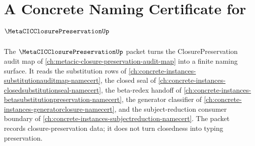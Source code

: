 \chapter{A Concrete Naming Certificate for $\MetaCICClosurePreservationUp$}
\label{ch:concrete-instances-metacicclosurepreservation-namecert}

The $\MetaCICClosurePreservationUp$ packet turns the ClosurePreservation audit map of \autoref{ch:metacic-closure-preservation-audit-map} into a finite naming surface. It reads the substitution rows of \autoref{ch:concrete-instances-substitutionauditmap-namecert}, the closed seal of \autoref{ch:concrete-instances-closedsubstitutionseal-namecert}, the beta-redex handoff of \autoref{ch:concrete-instances-betasubstitutionpreservation-namecert}, the generator classifier of \autoref{ch:concrete-instances-generatorclosure-namecert}, and the subject-reduction consumer boundary of \autoref{ch:concrete-instances-subjectreduction-namecert}. The packet records closure-preservation data; it does not turn closedness into typing preservation.

